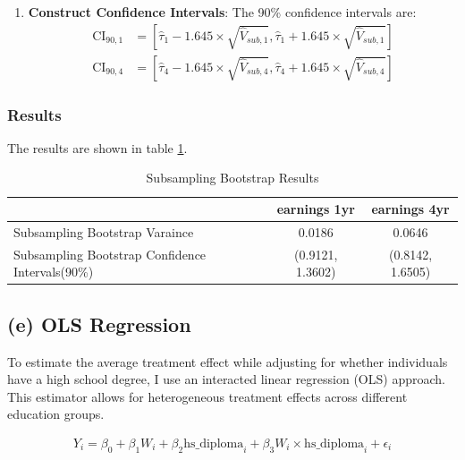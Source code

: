 \documentclass[11pt]{article}
\numberwithin{equation}{section}
\begin{document}
\begin{algorithm}
\begin{enumerate}
        \item \textbf{Construct Confidence Intervals}: The 90\% confidence intervals are:
        \begin{align}
            \text{CI}_{90,1} &= \left[\hat{\tau}_1 - 1.645 \times \sqrt{\hat{V}_{sub,1}}, \hat{\tau}_1 + 1.645 \times \sqrt{\hat{V}_{sub,1}}\right] \\
            \text{CI}_{90,4} &= \left[\hat{\tau}_4 - 1.645 \times \sqrt{\hat{V}_{sub,4}}, \hat{\tau}_4 + 1.645 \times \sqrt{\hat{V}_{sub,4}}\right]
        \end{align}
    \end{enumerate}
\end{algorithm}

\subsubsection{Results}

The results are shown in table \ref{tab:subsampling_bootstrap_results}.

\begin{table}[h]
    \centering
    \begin{tabular}{lcc}
        \hline
         & earnings 1yr & earnings 4yr \\
        \hline
        Subsampling Bootstrap Varaince & 0.0186 & 0.0646 \\
        Subsampling Bootstrap Confidence Intervals(90\%) & (0.9121, 1.3602) & (0.8142, 1.6505) \\
        \hline
    \end{tabular}
    \caption{\label{tab:subsampling_bootstrap_results}Subsampling Bootstrap Results}
\end{table}


\newpage


\subsection{(e) OLS Regression}

To estimate the average treatment effect while adjusting for whether individuals have a high school degree, I use an interacted linear regression (OLS) approach. 
This estimator allows for heterogeneous treatment effects across different education groups.

\begin{align}
    Y_i = \beta_0 + \beta_1 W_i + \beta_2 \text{hs\_diploma}_i + \beta_3 W_i \times \text{hs\_diploma}_i + \epsilon_i
\end{align}
\end{document}
